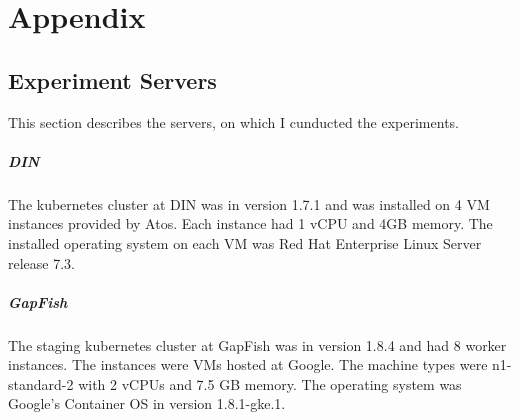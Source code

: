 \chapter*{Appendix}
\section*{Experiment Servers}
This section describes the servers, on which I cunducted the experiments.
\paragraph*{DIN}
The kubernetes cluster at DIN was in version 1.7.1 and was installed on 4 VM instances
provided by Atos. Each instance had 1 vCPU and 4GB memory. The installed operating system
on each VM was Red Hat Enterprise Linux Server release 7.3.
\paragraph*{GapFish}
The staging kubernetes cluster at GapFish was in version 1.8.4 and had 8 worker
instances. The instances were VMs hosted at Google. The machine types were n1-standard-2
with 2 vCPUs and 7.5 GB memory. The operating system was Google's Container OS in version
1.8.1-gke.1.
